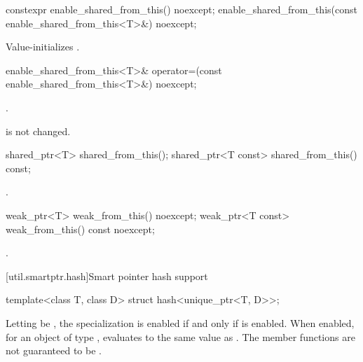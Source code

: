 %
\begin{itemdecl}
constexpr enable_shared_from_this() noexcept;
enable_shared_from_this(const enable_shared_from_this<T>&) noexcept;
\end{itemdecl}

\begin{itemdescr}
\pnum
\effects
Value-initializes .
\end{itemdescr}

%
\begin{itemdecl}
enable_shared_from_this<T>& operator=(const enable_shared_from_this<T>&) noexcept;
\end{itemdecl}

\begin{itemdescr}
\pnum
\returns
{}.

\pnum
\begin{note}
 is not changed.
\end{note}
\end{itemdescr}

%
%
\begin{itemdecl}
shared_ptr<T>       shared_from_this();
shared_ptr<T const> shared_from_this() const;
\end{itemdecl}

\begin{itemdescr}
\pnum
\returns
{}.
\end{itemdescr}

%
%
\begin{itemdecl}
weak_ptr<T>       weak_from_this() noexcept;
weak_ptr<T const> weak_from_this() const noexcept;
\end{itemdecl}

\begin{itemdescr}
\pnum
\returns
{}.
\end{itemdescr}

[util.smartptr.hash]{Smart pointer hash support}

%
\begin{itemdecl}
template<class T, class D> struct hash<unique_ptr<T, D>>;
\end{itemdecl}

\begin{itemdescr}
\pnum
Letting  be ,
the specialization  is enabled
if and only if  is enabled.
When enabled, for an object  of type ,
 evaluates to
the same value as .
The member functions are not guaranteed to be .
\end{itemdescr}

